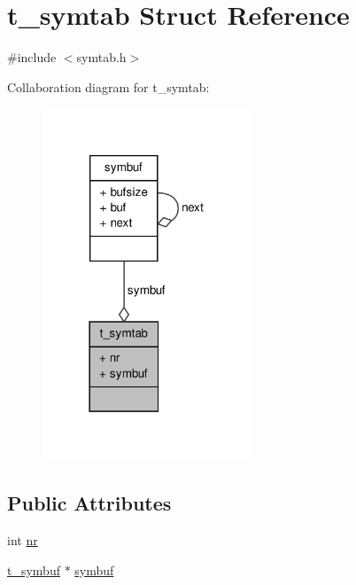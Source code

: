 \hypertarget{structt__symtab}{\section{t\-\_\-symtab \-Struct \-Reference}
\label{structt__symtab}
}


{\ttfamily \#include $<$symtab.\-h$>$}



\-Collaboration diagram for t\-\_\-symtab\-:
\nopagebreak
\begin{figure}[H]
\begin{center}
\leavevmode
\includegraphics[width=177pt]{structt__symtab__coll__graph}
\end{center}
\end{figure}
\subsection*{\-Public \-Attributes}
\begin{DoxyCompactItemize}
\item 
int \hyperlink{structt__symtab_a3a90a1c9860c6a6e06b573a9b339695e}{nr}
\item 
\hyperlink{include_2types_2symtab_8h_ad642f28aaf1b21848e02cc80198bcef9}{t\-\_\-symbuf} $\ast$ \hyperlink{structt__symtab_a1a2b7f6df8223a58af453450b50d2022}{symbuf}
\end{DoxyCompactItemize}


